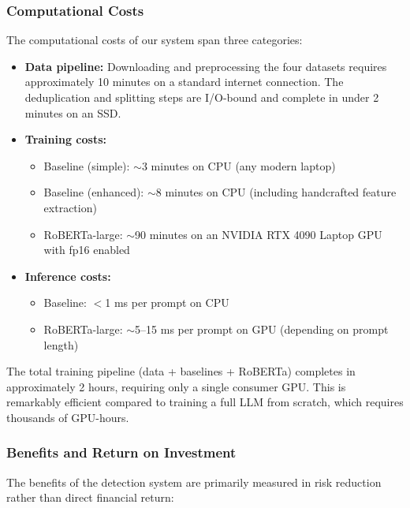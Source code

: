 \documentclass[12pt, letterpaper]{article}   %
\begin{document}
\subsubsection{Computational Costs}

The computational costs of our system span three categories:

\begin{itemize}
    \item \textbf{Data pipeline:} Downloading and preprocessing the four datasets requires approximately 10 minutes on a standard internet connection. The deduplication and splitting steps are I/O-bound and complete in under 2 minutes on an SSD.

    \item \textbf{Training costs:}
    \begin{itemize}
        \item Baseline (simple): $\sim$3 minutes on CPU (any modern laptop)
        \item Baseline (enhanced): $\sim$8 minutes on CPU (including handcrafted feature extraction)
        \item RoBERTa-large: $\sim$90 minutes on an NVIDIA RTX 4090 Laptop GPU with fp16 enabled
    \end{itemize}

    \item \textbf{Inference costs:}
    \begin{itemize}
        \item Baseline: $<$1 ms per prompt on CPU
        \item RoBERTa-large: $\sim$5--15 ms per prompt on GPU (depending on prompt length)
    \end{itemize}
\end{itemize}

The total training pipeline (data + baselines + RoBERTa) completes in approximately 2 hours, requiring only a single consumer GPU. This is remarkably efficient compared to training a full LLM from scratch, which requires thousands of GPU-hours.

\subsubsection{Benefits and Return on Investment}

The benefits of the detection system are primarily measured in risk reduction rather than direct financial return:
\end{document}
